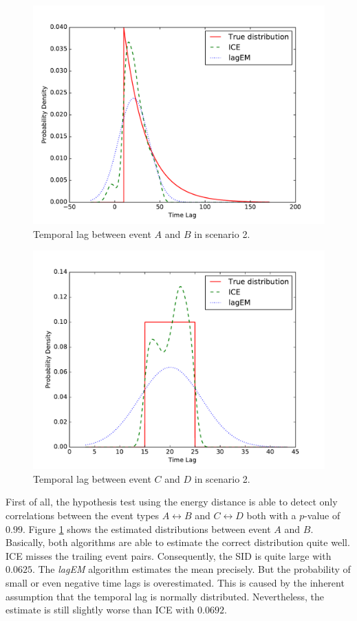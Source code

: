 \documentclass[conference]{IEEEtran}
\theoremstyle{examplestyle}
\begin{document}
\begin{figure}[!tb]
	\centering
	\includegraphics[scale=0.4]{images/scenarios/2-AB.pdf}
	\caption{Temporal lag between event \(A\) and \(B\) in scenario 2.}
	\label{fig:scen2-1}	
\end{figure}

\begin{figure}[!tb]
	\centering
	\includegraphics[scale=0.4]{images/scenarios/2-CD.pdf}
	\caption{Temporal lag between event \(C\) and \(D\) in scenario 2.}
	\label{fig:scen2-2}	
\end{figure}

First of all, the hypothesis test using the energy distance is able to detect only correlations between the event types \(A \leftrightarrow B\) and \(C \leftrightarrow D\) both with a \(p\)-value of $0.99$. Figure \ref{fig:scen2-1} shows the estimated distributions between event \(A\) and \(B\). Basically, both algorithms are able to estimate the correct distribution quite well. \ac{ICE} misses the trailing event pairs. Consequently, the \ac{SID} is quite large with $0.0625$. The \textit{lagEM} algorithm estimates the mean precisely. But the probability of small or even negative time lags is overestimated. This is caused by the inherent assumption that the temporal lag is normally distributed. Nevertheless, the estimate is still slightly worse than \ac{ICE} with $0.0692$.
\end{document}
